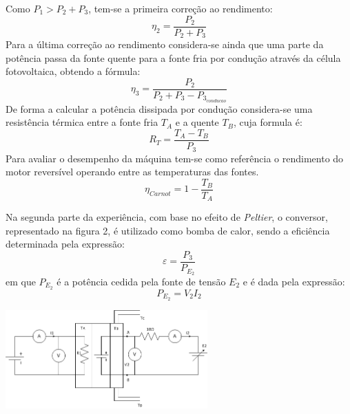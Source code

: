 \documentclass[10pt]{extarticle}
\begin{document}
\begin{multicols}{2}
Como $P_1 > P_2 + P_3$, tem-se a primeira correção ao rendimento:
\begin{equation}
\eta_2=\frac{P_2}{P_2+P_3}
\end{equation}
Para a última correção ao rendimento considera-se ainda que uma parte da potência passa da fonte quente para a fonte fria por condução através da célula fotovoltaica, obtendo a fórmula:
\begin{equation}
\eta_3=\frac{P_2}{P_2+P_3-P_{3_{conducao}}}
\end{equation}
De forma a calcular a potência dissipada por condução considera-se uma resistência térmica entre a fonte fria $T_A$ e a quente $T_B$, cuja formula é:
\begin{equation}
R_T = \frac{T_A - T_B}{P_3}
\end{equation}
Para avaliar o desempenho da máquina tem-se como referência o rendimento do motor reversível operando entre as temperaturas das fontes.
\begin{equation}
\eta_{Carnot} = 1 - \frac{T_B}{T_A}
\end{equation}

Na segunda parte da experiência, com base no efeito de \textit{Peltier}, o conversor, representado na figura 2, é utilizado como bomba de calor, sendo a eficiência determinada pela expressão:
\begin{equation}
\varepsilon=\frac{P_3}{P_{E_{2}}}
\end{equation}
em que $P_{E{_2}}$ é a potência cedida pela fonte de tensão $E_2$ e é dada pela expressão:
\begin{equation}
P_{E_{2}}= V_2 I_2
\end{equation}

\hspace{-0.8cm}
\begin{center}
\includegraphics[width=220pt]{figura2.png}
\begin{center}
\par{}
\end{center}
\end{center}


\end{multicols}
\end{document}
